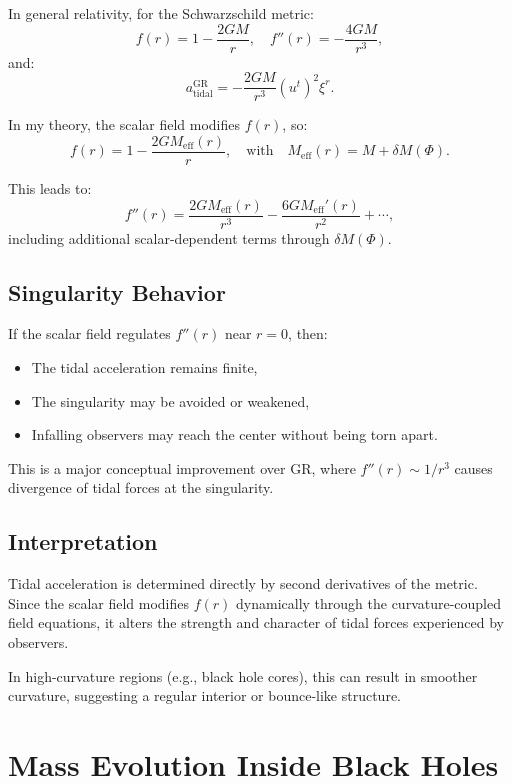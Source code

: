 \documentclass[12pt]{article}
\begin{document}
In general relativity, for the Schwarzschild metric:
\[
f(r) = 1 - \frac{2GM}{r}, \quad f''(r) = -\frac{4GM}{r^3},
\]
and:
\[
a_{\text{tidal}}^{\text{GR}} = -\frac{2GM}{r^3} (u^t)^2 \xi^r.
\]

In my theory, the scalar field modifies \( f(r) \), so:
\begin{equation}
f(r) = 1 - \frac{2GM_{\text{eff}}(r)}{r}, \quad \text{with} \quad M_{\text{eff}}(r) = M + \delta M(\Phi).
\end{equation}

This leads to:
\[
f''(r) = \frac{2GM_{\text{eff}}(r)}{r^3} - \frac{6GM_{\text{eff}}'(r)}{r^2} + \cdots,
\]
including additional scalar-dependent terms through \( \delta M(\Phi) \).

\subsection{Singularity Behavior}

If the scalar field regulates \( f''(r) \) near \( r = 0 \), then:
\begin{itemize}
    \item The tidal acceleration remains finite,
    \item The singularity may be avoided or weakened,
    \item Infalling observers may reach the center without being torn apart.
\end{itemize}

This is a major conceptual improvement over GR, where \( f''(r) \sim 1/r^3 \) causes divergence of tidal forces at the singularity.

\subsection{Interpretation}

Tidal acceleration is determined directly by second derivatives of the metric. Since the scalar field modifies \( f(r) \) dynamically through the curvature-coupled field equations, it alters the strength and character of tidal forces experienced by observers.

In high-curvature regions (e.g., black hole cores), this can result in smoother curvature, suggesting a regular interior or bounce-like structure.

\section{Mass Evolution Inside Black Holes}
\end{document}

